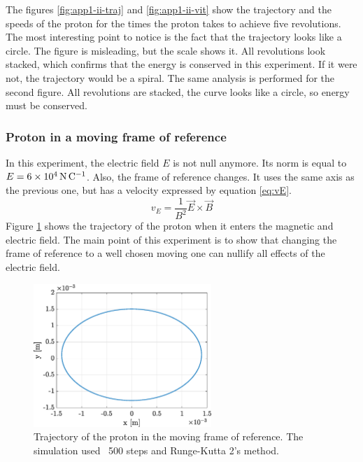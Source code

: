 \documentclass[a4paper,12pt,twoside]{article}
\begin{document}
The figures \ref{fig:app1-ii-traj} and \ref{fig:app1-ii-vit} show the trajectory and the speeds of the proton for the times the proton takes to achieve five revolutions.
The most interesting point to notice is the fact that the trajectory looks like a circle.
The figure is misleading, but the scale shows it.
All revolutions look stacked, which confirms that the energy is conserved in this experiment.
If it were not, the trajectory would be a spiral.
The same analysis is performed for the second figure.
All revolutions are stacked, the curve looks like a circle, so energy must be conserved.\\

\subsubsection{Proton in a moving frame of reference}
In this experiment, the electric field $E$ is not null anymore.
Its norm is equal to $E=\SI{6d4}{\newton\per\coulomb}$.
Also, the frame of reference changes.
It uses the same axis as the previous one, but has a velocity expressed by equation \ref{eq:vE}.
\begin{equation}
	v_E = \frac{1}{B^2}\vec{E}\times\vec{B}
	\label{eq:vE}
\end{equation}%
Figure \ref{fig:app1_iii_traj} shows the trajectory of the proton when it enters the magnetic and electric field.
The main point of this experiment is to show that changing the frame of reference to a well chosen moving one can nullify all effects of the electric field.
\begin{figure}[h]
\centering
	\includegraphics[width=0.6\textwidth]{graphs/app1_iii_traj.eps}
	\caption{Trajectory of the proton in the moving frame of reference. The simulation used \SI{}{500} steps and Runge-Kutta 2's method.}
	\label{fig:app1_iii_traj}
\end{figure}
\end{document}
